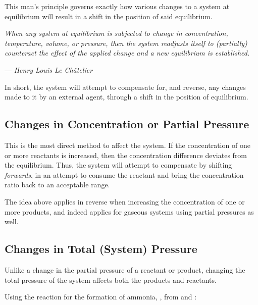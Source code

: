 			This man's principle governs exactly how various changes to a system at equilibrium will result in a shift in the position of
			said equilibrium.

			\textit{When any system at equilibrium is subjected to change in concentration, temperature, volume, or pressure, then the
			system readjusts itself to (partially) counteract the effect of the applied change and a new equilibrium is established.}

			--- \textit{Henry Louis Le Châtelier}

			In short, the system will attempt to compensate for, and reverse, any changes made to it by an external agent, through a shift
			in the position of equilibrium.



		\subsection{Changes in Concentration or Partial Pressure}

			This is the most direct method to affect the system. If the concentration of one or more reactants is increased, then the
			concentration difference deviates from the equilibrium. Thus, the system will attempt to compensate by shifting \textit{forwards},
			in an attempt to consume the reactant and bring the concentration ratio back to an acceptable range.

			The idea above applies in reverse when increasing the concentration of one or more products, and indeed applies for gaseous
			systems using partial pressures as well.




		\subsection{Changes in Total (System) Pressure}

			Unlike a change in the partial pressure of a reactant or product, changing the total pressure of the system affects both
			the products and reactants.

			Using the reaction for the formation of ammonia, , from  and :


